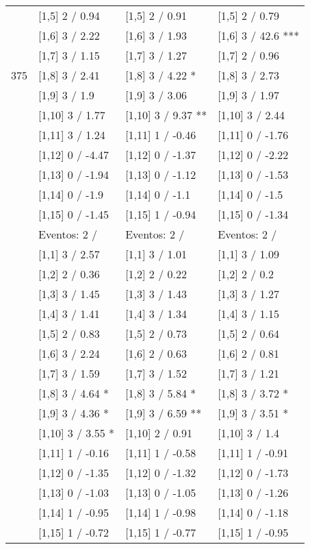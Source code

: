 \begin{table}
\begin{tabular}[t]{llll}
 & {}[1,5] 2  / 0.94 & {}[1,5] 2  / 0.91 & {}[1,5] 2  / 0.79\\
 & {}[1,6] 3  / 2.22 & {}[1,6] 3  / 1.93 & {}[1,6] 3  / 42.6 ***\\
 & {}[1,7] 3  / 1.15 & {}[1,7] 3  / 1.27 & {}[1,7] 2  / 0.96\\
375 & {}[1,8] 3  / 2.41 & {}[1,8] 3  / 4.22 * & {}[1,8] 3  / 2.73\\
\addlinespace
 & {}[1,9] 3  / 1.9 & {}[1,9] 3  / 3.06 & {}[1,9] 3  / 1.97\\
 & {}[1,10] 3  / 1.77 & {}[1,10] 3  / 9.37 ** & {}[1,10] 3  / 2.44\\
 & {}[1,11] 3  / 1.24 & {}[1,11] 1  / -0.46 & {}[1,11] 0  / -1.76\\
 & {}[1,12] 0  / -4.47 & {}[1,12] 0  / -1.37 & {}[1,12] 0  / -2.22\\
 & {}[1,13] 0  / -1.94 & {}[1,13] 0  / -1.12 & {}[1,13] 0  / -1.53\\
\addlinespace
 & {}[1,14] 0  / -1.9 & {}[1,14] 0  / -1.1 & {}[1,14] 0  / -1.5\\
 & {}[1,15] 0  / -1.45 & {}[1,15] 1  / -0.94 & {}[1,15] 0  / -1.34\\
 & Eventos:  2 / & Eventos:  2 / & Eventos:  2 /\\
 & {}[1,1] 3  / 2.57 & {}[1,1] 3  / 1.01 & {}[1,1] 3  / 1.09\\
 & {}[1,2] 2  / 0.36 & {}[1,2] 2  / 0.22 & {}[1,2] 2  / 0.2\\
\addlinespace
 & {}[1,3] 3  / 1.45 & {}[1,3] 3  / 1.43 & {}[1,3] 3  / 1.27\\
 & {}[1,4] 3  / 1.41 & {}[1,4] 3  / 1.34 & {}[1,4] 3  / 1.15\\
 & {}[1,5] 2  / 0.83 & {}[1,5] 2  / 0.73 & {}[1,5] 2  / 0.64\\
 & {}[1,6] 3  / 2.24 & {}[1,6] 2  / 0.63 & {}[1,6] 2  / 0.81\\
 & {}[1,7] 3  / 1.59 & {}[1,7] 3  / 1.52 & {}[1,7] 3  / 1.21\\
\addlinespace
500 & {}[1,8] 3  / 4.64 * & {}[1,8] 3  / 5.84 * & {}[1,8] 3  / 3.72 *\\
 & {}[1,9] 3  / 4.36 * & {}[1,9] 3  / 6.59 ** & {}[1,9] 3  / 3.51 *\\
 & {}[1,10] 3  / 3.55 * & {}[1,10] 2  / 0.91 & {}[1,10] 3  / 1.4\\
 & {}[1,11] 1  / -0.16 & {}[1,11] 1  / -0.58 & {}[1,11] 1  / -0.91\\
 & {}[1,12] 0  / -1.35 & {}[1,12] 0  / -1.32 & {}[1,12] 0  / -1.73\\
\addlinespace
 & {}[1,13] 0  / -1.03 & {}[1,13] 0  / -1.05 & {}[1,13] 0  / -1.26\\
 & {}[1,14] 1  / -0.95 & {}[1,14] 1  / -0.98 & {}[1,14] 0  / -1.18\\
 & {}[1,15] 1  / -0.72 & {}[1,15] 1  / -0.77 & {}[1,15] 1  / -0.95\\
\bottomrule
\end{tabular}
\end{table}
